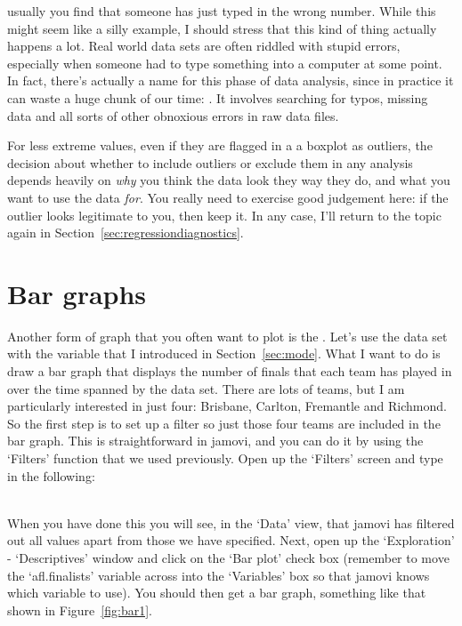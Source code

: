 usually you find that someone has just typed in the wrong number. While this might seem like a silly example, I should stress that this kind of thing actually happens a lot. Real world data sets are often riddled with stupid errors, especially when someone had to type something into a computer at some point. In fact, there's actually a name for this phase of data analysis, since in practice it can waste a huge chunk of our time: . It involves searching for typos, missing data and all sorts of other obnoxious errors in raw data files.

For less extreme values, even if they are flagged in a a boxplot as outliers, the decision about whether to include outliers or exclude them in any analysis depends heavily on {\it why} you think the data look they way they do, and what you want to use the data {\it for}. You really need to exercise good judgement here: if the outlier looks legitimate to you, then keep it. In any case, I'll return to the topic again in Section~\ref{sec:regressiondiagnostics}. 



\section{Bar graphs\label{sec:bargraph}}

Another form of graph that you often want to plot is the . Let's use the  data set with the  variable that I introduced in Section~\ref{sec:mode}. What I want to do is draw a bar graph that displays the number of finals that each team has played in over the time spanned by the  data set. There are lots of teams, but I am particularly interested in just four: Brisbane, Carlton, Fremantle and Richmond. So the first step is to set up a filter so just those four teams are included in the bar graph. This is straightforward in jamovi, and you can do it by using the `Filters' function that we used previously. Open up the `Filters' screen and type in the following: 

\noindent
{} \\

When you have done this you will see, in the `Data' view, that jamovi has filtered out all values apart from those we have specified. Next, open up the `Exploration' - `Descriptives' window and click on the `Bar plot' check box (remember to move the `afl.finalists' variable across into the `Variables' box so that jamovi knows which variable to use). You should then get a bar graph, something like that shown in Figure~\ref{fig:bar1}.

